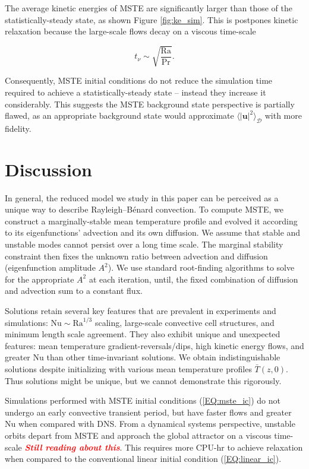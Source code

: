 \documentclass[reprint,amsmath,amssymb,aps]{revtex4-1}
\newcommand{\note}[1]{\noindent \textbf{\textit{\textcolor{Red}{#1}}}}
\newcommand\Ra{\mathrm{Ra}}
\newcommand\Nu{\mathrm{Nu}}
\newcommand{\eq}[1]{(\ref{#1})}
\begin{document}
The average kinetic energies of MSTE are significantly larger than those of the statistically-steady state, as shown Figure \ref{fig:ke_sim}. 
This is postpones kinetic relaxation because the large-scale flows decay on a viscous time-scale

\begin{equation}
    t_{\nu} \sim \sqrt{\frac{\Ra}{\Pr}}. \nonumber
\end{equation}

Consequently, MSTE initial conditions do not reduce the simulation time required to achieve a statistically-steady state -- instead they increase it considerably. 
This suggests the MSTE background state perspective is partially flawed, as an appropriate background state would approximate $\langle|\mathbf{u}|^2 \rangle_{\mathcal{D}}$ with more fidelity.

\section{Discussion}\label{sec:Discussion}
In general, the reduced model we study in this paper can be perceived as a unique way to describe Rayleigh–Bénard convection. 
To compute MSTE, we construct a marginally-stable mean temperature profile and evolved it according to its eigenfunctions' advection and its own diffusion. 
We assume that stable and unstable modes cannot persist over a long time scale. 
The marginal stability constraint then fixes the unknown ratio between advection and diffusion (eigenfunction amplitude $A^2$). 
We use standard root-finding algorithms to solve for the appropriate $A^2$ at each iteration, until, the fixed combination of diffusion and advection sum to a constant flux.

Solutions retain several key features that are prevalent in experiments and simulations: $\Nu \sim\Ra^{1/3}$ scaling, large-scale convective cell structures, and minimum length scale agreement. 
They also exhibit unique and unexpected features: mean temperature gradient-reversals/dips, high kinetic energy flows, and greater $\Nu$ than other time-invariant solutions. 
We obtain indistinguishable solutions despite initializing with various mean temperature profiles $\bar{T}(z, 0)$. 
Thus solutions might be unique, but we cannot demonstrate this rigorously.

Simulations performed with MSTE initial conditions \eq{EQ:mste_ic} do not undergo an early convective transient period, but have faster flows and greater $\Nu$ when compared with DNS. 
From a dynamical systems perspective, unstable orbits depart from MSTE and approach the global attractor on a viscous time-scale \note{Still reading about this}. This requires more CPU-hr to achieve relaxation when compared to the conventional linear initial condition \eq{EQ:linear_ic}.
\end{document}
